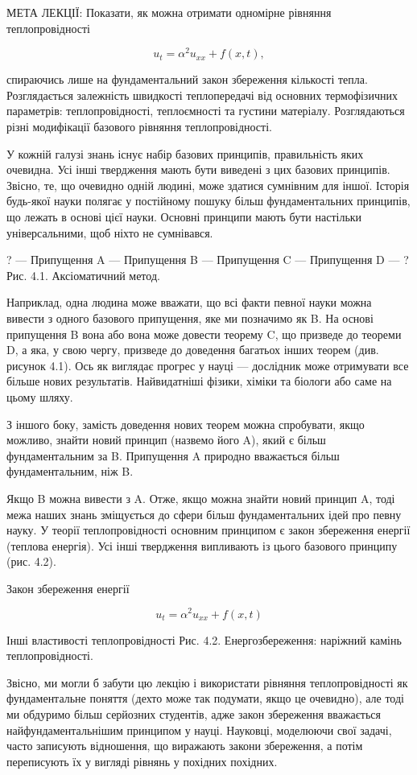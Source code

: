 \documentclass[
  ukrainian,
]{article}
\begin{document}
МЕТА ЛЕКЦІЇ: Показати, як можна отримати одномірне рівняння
теплопровідності

\[
u_t = \alpha^2 u_{xx} + f(x, t),
\]

спираючись лише на фундаментальний закон збереження кількості тепла.
Розглядається залежність швидкості теплопередачі від основних
термофізичних параметрів: теплопровідності, теплоємності та густини
матеріалу. Розглядаються різні модифікації базового рівняння
теплопровідності.

У кожній галузі знань існує набір базових принципів, правильність яких
очевидна. Усі інші твердження мають бути виведені з цих базових
принципів. Звісно, те, що очевидно одній людині, може здатися сумнівним
для іншої. Історія будь-якої науки полягає у постійному пошуку більш
фундаментальних принципів, що лежать в основі цієї науки. Основні
принципи мають бути настільки універсальними, щоб ніхто не сумнівався.

? --- Припущення A --- Припущення B --- Припущення C --- Припущення D
--- ? Рис. 4.1. Аксіоматичний метод.

Наприклад, одна людина може вважати, що всі факти певної науки можна
вивести з одного базового припущення, яке ми позначимо як B. На основі
припущення B вона або вона може довести теорему C, що призведе до
теореми D, а яка, у свою чергу, призведе до доведення багатьох інших
теорем (див. рисунок 4.1). Ось як виглядає прогрес у науці --- дослідник
може отримувати все більше нових результатів. Найвидатніші фізики,
хіміки та біологи або саме на цьому шляху.

З іншого боку, замість доведення нових теорем можна спробувати, якщо
можливо, знайти новий принцип (назвемо його A), який є більш
фундаментальним за B. Припущення A природно вважається більш
фундаментальним, ніж B.

Якщо B можна вивести з A. Отже, якщо можна знайти новий принцип A, тоді
межа наших знань зміщується до сфери більш фундаментальних ідей про
певну науку. У теорії теплопровідності основним принципом є закон
збереження енергії (теплова енергія). Усі інші твердження випливають із
цього базового принципу (рис. 4.2).

Закон збереження енергії

\[
u_t = \alpha^2 u_{xx} + f(x,t)
\]

Інші властивості теплопровідності Рис. 4.2. Енергозбереження: наріжний
камінь теплопровідності.

Звісно, ми могли б забути цю лекцію і використати рівняння
теплопровідності як фундаментальне поняття (дехто може так подумати,
якщо це очевидно), але тоді ми обдуримо більш серйозних студентів, адже
закон збереження вважається найфундаментальнішим принципом у науці.
Науковці, моделюючи свої задачі, часто записують відношення, що
виражають закони збереження, а потім переписують їх у вигляді рівнянь у
похідних похідних.
\end{document}
